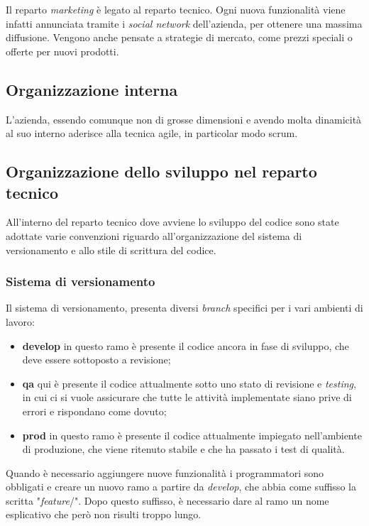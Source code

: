 Il reparto \textit{marketing} è legato al reparto tecnico. Ogni nuova
funzionalità viene infatti annunciata tramite i \textit{social network}
dell'azienda, per ottenere una massima diffusione. Vengono anche pensate a
strategie di mercato, come prezzi speciali o offerte per nuovi prodotti.

\subsection{Organizzazione interna}

L'azienda, essendo comunque non di grosse dimensioni e avendo molta dinamicità
al suo interno aderisce alla tecnica \gls{agile}, in particolar modo
\gls{scrum}.

\subsection{Organizzazione dello sviluppo nel reparto tecnico}
\label{intro:OrganizzazioneSviluppoRepartoTecnico}

All'interno del reparto tecnico dove avviene lo sviluppo del codice sono state
adottate varie convenzioni riguardo all'organizzazione del sistema di
versionamento e allo stile di scrittura del codice.

\subsubsection{Sistema di versionamento}

Il sistema di versionamento, presenta diversi \textit{branch} specifici per i
vari ambienti di lavoro:
\begin{itemize}

\item \textbf{develop} in questo ramo è presente il codice ancora in fase di
sviluppo, che deve essere sottoposto a revisione;
\item \textbf{qa} qui è presente il codice attualmente sotto uno stato di
revisione e \textit{testing}, in cui ci si vuole assicurare che tutte le
attività implementate siano prive di errori e rispondano come dovuto;
\item \textbf{prod} in questo ramo è presente il codice attualmente impiegato
nell'ambiente di produzione, che viene ritenuto stabile e che ha passato i test
di qualità.
\end{itemize}

Quando è necessario aggiungere nuove funzionalità i programmatori sono
obbligati e creare un nuovo ramo a partire da \textit{develop}, che abbia come
suffisso la scritta "\textit{feature}/". Dopo questo suffisso, è necessario dare
al ramo un nome esplicativo che però non risulti troppo lungo.

